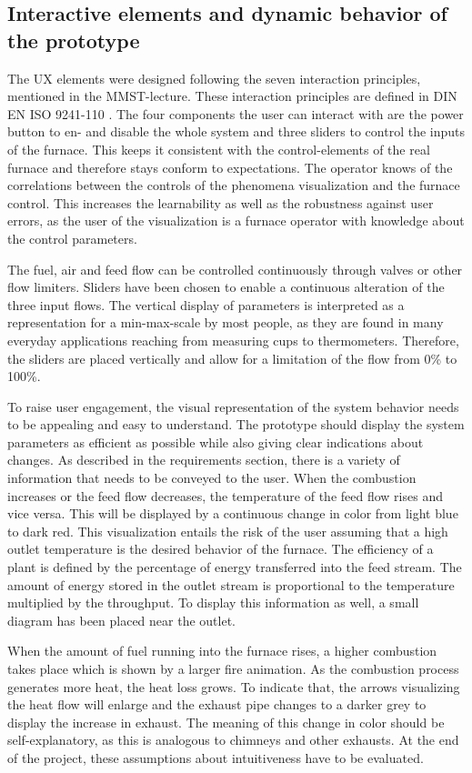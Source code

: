 \subsection*{Interactive elements and dynamic behavior of the prototype}

The \ac{UX} elements were designed following the seven interaction principles, mentioned in the \ac{MMST}-lecture. These interaction principles are defined in DIN EN ISO 9241-110 \cite{din_9241-110}. The four components the user can interact with are the power button to en- and disable the whole system and three sliders to control the inputs of the furnace. This keeps it consistent with the control-elements of the real furnace and therefore stays conform to expectations. The operator knows of the correlations between the controls of the phenomena visualization and the furnace control. This increases the learnability as well as the robustness against user errors, as the user of the visualization is a furnace operator with knowledge about the control parameters. 

The fuel, air and feed flow can be controlled continuously through valves or other flow limiters. Sliders have been chosen to enable a continuous alteration of the three input flows. The vertical display of parameters is interpreted as a representation for a min-max-scale by most people, as they are found in many everyday applications reaching from measuring cups to thermometers. Therefore, the sliders are placed vertically and allow for a limitation of the flow from 0\% to 100\%.

To raise user engagement, the visual representation of the system behavior needs to be appealing and easy to understand. The prototype should display the system parameters as efficient as possible while also giving clear indications about changes. As described in the requirements section, there is a variety of information that needs to be conveyed to the user. When the combustion increases or the feed flow decreases, the temperature of the feed flow rises and vice versa. This will be displayed by a continuous change in color from light blue to dark red. This visualization entails the risk of the user assuming that a high outlet temperature is the desired behavior of the furnace. The efficiency of a plant is defined by the percentage of energy transferred into the feed stream. The amount of energy stored in the outlet stream is proportional to the temperature multiplied by the throughput. To display this information as well, a small diagram has been placed near the outlet.

When the amount of fuel running into the furnace rises, a higher combustion takes place which is shown by a larger fire animation. As the combustion process generates more heat, the heat loss grows. To indicate that, the arrows visualizing the heat flow will enlarge and the exhaust pipe changes to a darker grey to display the increase in exhaust. The meaning of this change in color should be self-explanatory, as this is analogous to chimneys and other exhausts. At the end of the project, these assumptions about intuitiveness have to be evaluated.




